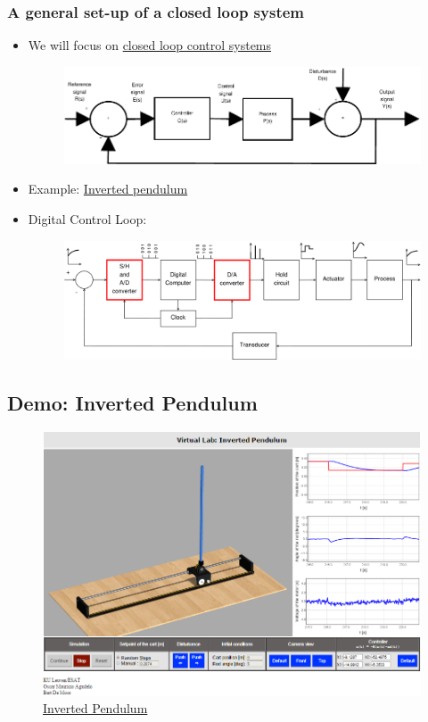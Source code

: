 \begin{frame}
	\frametitle{A general set-up of a closed loop system}
	\vspace*{-1em}
	\begin{itemize}
		\item We will focus on \underline{closed loop control systems}
		\begin{figure}
\centering
\includegraphics[width=0.7\linewidth]{Closed-Loop}
\label{fig:Closed-Loop}
\end{figure}
\item Example: \href{http://homes.esat.kuleuven.be/~magudelo/_html5/test11.html}{Inverted pendulum}

\item Digital Control Loop:
\begin{figure}
\centering
\includegraphics[width=0.6\linewidth]{digital-control-system}
\label{fig:digital-control-system}
\end{figure}

	\end{itemize}
\end{frame}

\subsection[Demo: Inverted Pendulum]{Demo: Inverted Pendulum}
\begin{frame}
	\begin{figure}
\centering
\includegraphics[width=0.7\linewidth]{"Inverted Pendulum"}
\caption{\href{http://homes.esat.kuleuven.be/~magudelo/_html5/test11.html}{{Inverted Pendulum}}}
\label{fig:InvertedPendulum}
\end{figure}
\end{frame}

